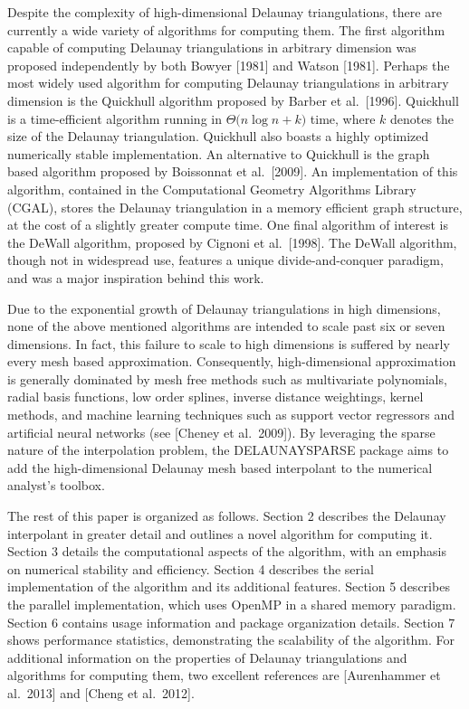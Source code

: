 {Despite the complexity of high-dimensional Delaunay triangulations,
there are currently a wide variety of algorithms for computing them.
The first algorithm capable of computing Delaunay triangulations in
arbitrary dimension was proposed independently by both Bowyer [1981]
and Watson [1981]. Perhaps the most widely used algorithm for computing
Delaunay triangulations in arbitrary dimension is the Quickhull algorithm
proposed by Barber et al.\ [1996]. Quickhull is a time-efficient
algorithm running in $\Theta \big(n\log n + k\big)$ time, where $k$
denotes the size of the Delaunay triangulation. Quickhull also boasts
a highly optimized numerically stable implementation. An alternative
to Quickhull is the graph based algorithm proposed by Boissonnat et
al.\ [2009]. An implementation of this algorithm, contained in the
Computational Geometry Algorithms Library (CGAL), stores the
Delaunay triangulation in a memory efficient graph structure, at the
cost of a slightly greater compute time. One final algorithm of interest
is the DeWall algorithm, proposed by Cignoni et al.\ [1998]. The DeWall 
algorithm, though not in widespread use, features a unique
divide-and-conquer paradigm, and was a major inspiration behind this work.

Due to the exponential growth of Delaunay triangulations in high
dimensions, none of the above mentioned algorithms are intended to
scale past six or seven dimensions. In fact, this failure to scale
to high dimensions is suffered by nearly every mesh based approximation.
Consequently, high-dimensional approximation is generally dominated by
mesh free methods such as multivariate polynomials, radial basis
functions, low order splines, inverse distance weightings, kernel
methods, and machine learning techniques such as support vector
regressors and artificial neural networks (see [Cheney et al.\ 2009]).
By leveraging the sparse nature of the interpolation problem, the
DELAUNAYSPARSE package aims to add the high-dimensional Delaunay mesh
based interpolant to the numerical analyst's toolbox.

The rest of this paper is organized as follows. Section 2 describes
the Delaunay interpolant in greater detail and outlines a novel algorithm
for computing it. Section 3 details the computational aspects of the
algorithm, with an emphasis on numerical stability and efficiency.
Section 4 describes the serial implementation of the algorithm and its
additional features. Section 5 describes the parallel implementation,
which uses OpenMP in a shared memory paradigm. Section 6 contains usage
information and package organization details. Section 7 shows performance
statistics, demonstrating the scalability of the algorithm. For additional
information on the properties of Delaunay triangulations and algorithms for
computing them, two excellent references are [Aurenhammer et al.\ 2013]
and [Cheng et al.\ 2012].

}
